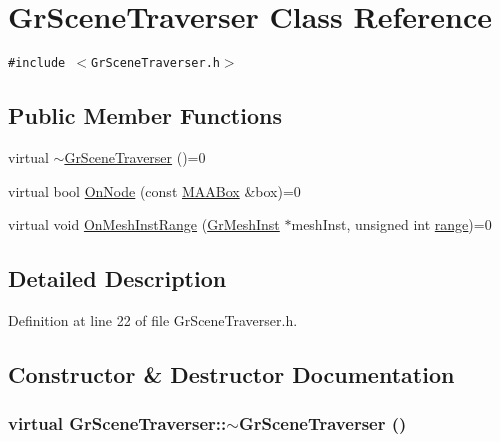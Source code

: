 \hypertarget{class_gr_scene_traverser}{
\section{GrSceneTraverser Class Reference}
\label{class_gr_scene_traverser}
}
{\tt \#include $<$GrSceneTraverser.h$>$}

\subsection*{Public Member Functions}
\begin{CompactItemize}
\item 
virtual \hyperlink{class_gr_scene_traverser_e82edced05792aa933e23642f3112226}{$\sim$GrSceneTraverser} ()=0
\item 
virtual bool \hyperlink{class_gr_scene_traverser_f6c83b18404f6b8c9e20824676eb19f8}{OnNode} (const \hyperlink{class_m_a_a_box}{MAABox} \&box)=0
\item 
virtual void \hyperlink{class_gr_scene_traverser_4b78a9ad02a45670f5f3f7544ac3f411}{OnMeshInstRange} (\hyperlink{class_gr_mesh_inst}{GrMeshInst} $\ast$meshInst, unsigned int \hyperlink{glext__bak_8h_7b8ad0b27a927682837f95528fa454f5}{range})=0
\end{CompactItemize}


\subsection{Detailed Description}


Definition at line 22 of file GrSceneTraverser.h.

\subsection{Constructor \& Destructor Documentation}
\hypertarget{class_gr_scene_traverser_e82edced05792aa933e23642f3112226}{
\subsubsection[{$\sim$GrSceneTraverser}]{\setlength{\rightskip}{0pt plus 5cm}virtual GrSceneTraverser::$\sim$GrSceneTraverser ()}}
\label{class_gr_scene_traverser_e82edced05792aa933e23642f3112226}




